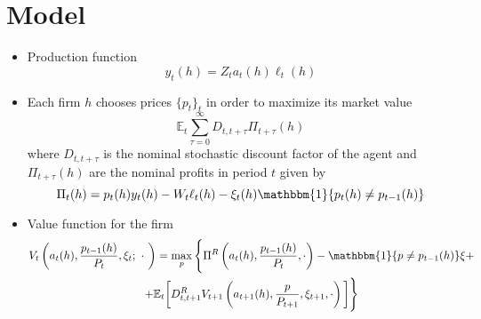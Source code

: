 \documentclass[a4paper,10pt]{article}  %
\begin{document}
\section{Model} %
\label{sec:model}
\begin{itemize}
   \item Production function
   \begin{equation}
      \label{eq:model_eq1}
      y_t(h) = Z_t a_t(h) \ell_t(h)
   \end{equation}

   \item Each firm $h$ chooses prices $ \{p_t\}_{t} $ in order to maximize its market value
   \begin{equation}
      \label{eq:model_eq}
      \mathbb{E}_t \sum_{\tau=0}^{\infty} D_{t,t+\tau} \Pi_{t+\tau} (h)
   \end{equation}
   where $D_{t,t+\tau}$ is the nominal stochastic discount factor of the agent and $\Pi_{t+\tau} (h)  $
   are the nominal profits in period $ t $ given by
   \begin{equation}
      \label{eq:model_eq3}
      \Pi_t(h) = p_t(h) y_t(h) - W_t \ell_t(h) - \xi_t(h) \mathbbm{1}\{p_t(h) \ne p_{t-1}(h)\}
   \end{equation}
   \item Value function for the firm
   \begin{multline}
      V_t \left( a_t(h), \frac{ p_{t-1}(h) }{ P_t }, \xi_t; \ \cdot \ \right) = 
      \max_{p} 
      \Bigg\{
         \Pi^R \left( a_t(h), \frac{ p_{t-1}(h) }{ P_t }, \cdot \right) 
         -\mathbbm{1} \{p \ne p_{t-1}(h ) \} \xi + \\
         + \mathbb{E}_t \bigg[ D^R_{t,t+1} V_{t+1} \left( a_{t+1}(h), \frac{ p }{ P_{t+1} }, \xi_{t+1}, \cdot \right) \bigg] \Bigg\}
   \end{multline}



\end{itemize}
\end{document}
